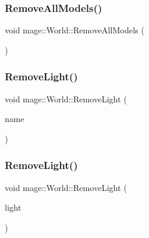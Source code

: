 \hypertarget{classmage_1_1_world_af3bae7b62192de9edda5e0567b73be93}{}\label{classmage_1_1_world_af3bae7b62192de9edda5e0567b73be93} 
\subsubsection{\texorpdfstring{Remove\+All\+Models()}{RemoveAllModels()}}
{\footnotesize\ttfamily void mage\+::\+World\+::\+Remove\+All\+Models (\begin{DoxyParamCaption}{ }\end{DoxyParamCaption})}

\hypertarget{classmage_1_1_world_a06f60650aa7992f44167043d1aa2e576}{}\label{classmage_1_1_world_a06f60650aa7992f44167043d1aa2e576} 
\subsubsection{\texorpdfstring{Remove\+Light()}{RemoveLight()}\hspace{0.1cm}{\footnotesize\ttfamily [1/2]}}
{\footnotesize\ttfamily void mage\+::\+World\+::\+Remove\+Light (\begin{DoxyParamCaption}\item[{const string \&}]{name }\end{DoxyParamCaption})}

\hypertarget{classmage_1_1_world_ab2bca0a737500b2d78b39e6cbafd61d0}{}\label{classmage_1_1_world_ab2bca0a737500b2d78b39e6cbafd61d0} 
\subsubsection{\texorpdfstring{Remove\+Light()}{RemoveLight()}\hspace{0.1cm}{\footnotesize\ttfamily [2/2]}}
{\footnotesize\ttfamily void mage\+::\+World\+::\+Remove\+Light (\begin{DoxyParamCaption}\item[{\hyperlink{namespacemage_a1e01ae66713838a7a67d30e44c67703e}{Shared\+Ptr}$<$ \hyperlink{classmage_1_1_point_light}{Point\+Light} $>$}]{light }\end{DoxyParamCaption})}

